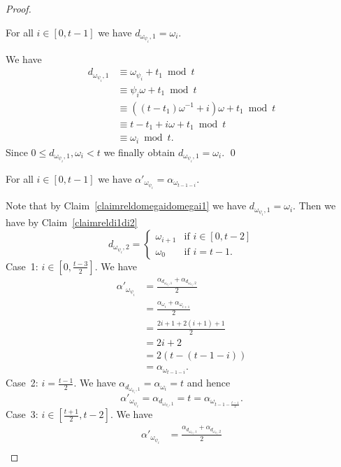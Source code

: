 \documentclass[10pt,a4paper]{amsart}
\begin{document}
\begin{proof}
\begin{claim}\label{claimreldomegaidomegai1}
For all $i \in [0,t-1]$ we have $d_{\omega_{\psi_i},1} = \omega_i$.
\end{claim}
We have
\begin{align*}
d_{\omega_{\psi_i},1} &\equiv \omega_{\psi_i} + t_1 \bmod t\\
&\equiv \psi_i \omega + t_1 \bmod t\\
&\equiv ((t-t_1)\omega^{-1}+i)\omega + t_1 \bmod t\\
&\equiv t-t_1+i\omega+t_1 \bmod t\\
&\equiv \omega_i \bmod t.
\end{align*}
Since $0 \leq d_{\omega_{\psi_i},1},\omega_i < t$ we finally obtain $d_{\omega_{\psi_i},1} = \omega_i$.
\qed

\begin{claim}\label{claimrelpsiil1i}
For all $i \in [0,t-1]$ we have $\alpha'_{\omega_{\psi_i}} = \alpha_{\omega_{t-1-i}}$.
\end{claim}
Note that by Claim~\ref{claimreldomegaidomegai1} we have $d_{\omega_{\psi_i},1} = \omega_i$. Then we have by Claim~\ref{claimreldi1di2}
\begin{displaymath}
d_{\omega_{\psi_i},2} = \begin{cases}
\omega_{i+1} & \text{if } i \in [0,t-2]\\
\omega_0 & \text{if } i = t-1.
\end{cases}
\end{displaymath}
Case~1: $i \in [0,\frac{t-3}{2}]$. We have
\begin{align*}
\alpha'_{\omega_{\psi_i}}&= \frac{\alpha_{d_{\omega_{\psi_i},1}} + \alpha_{d_{\omega_{\psi_i},2}}}{2}\\
&= \frac{\alpha_{\omega_i} + \alpha_{\omega_{i+1}}}{2}\\
&= \frac{2i+1 + 2(i+1)+1}{2}\\
&= 2i+2\\
&= 2(t-(t-1-i))\\
&= \alpha_{\omega_{t-1-i}}.
\end{align*}
Case~2: $i = \frac{t-1}{2}$. We have $\alpha_{d_{\omega_{\psi_i},1}} = \alpha_{\omega_i} = t$ and hence
\begin{displaymath}
\alpha'_{\omega_{\psi_i}} = \alpha_{d_{\omega_{\psi_i},1}} = t = \alpha_{\omega_{t-1-\frac{t-1}{2}}}.
\end{displaymath}
Case~3: $i \in [\frac{t+1}{2},t-2]$. We have
\begin{align*}
\alpha'_{\omega_{\psi_i}}&= \frac{\alpha_{d_{\omega_{\psi_i},1}} + \alpha_{d_{\omega_{\psi_i},2}}}{2}\\

\end{align*}
\end{proof}
\end{document}

